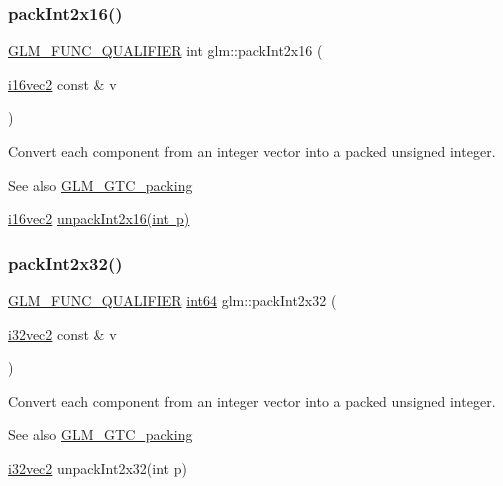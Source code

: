 \subsubsection{\texorpdfstring{pack\+Int2x16()}{packInt2x16()}}
{\footnotesize\ttfamily \mbox{\hyperlink{setup_8hpp_a33fdea6f91c5f834105f7415e2a64407}{G\+L\+M\+\_\+\+F\+U\+N\+C\+\_\+\+Q\+U\+A\+L\+I\+F\+I\+ER}} int glm\+::pack\+Int2x16 (\begin{DoxyParamCaption}\item[{\mbox{\hyperlink{group__gtc__type__precision_gad912fd04abb876a5b806118ec6e0f283}{i16vec2}} const \&}]{v }\end{DoxyParamCaption})}

Convert each component from an integer vector into a packed unsigned integer.

\begin{DoxySeeAlso}{See also}
\mbox{\hyperlink{group__gtc__packing}{G\+L\+M\+\_\+\+G\+T\+C\+\_\+packing}} 

\mbox{\hyperlink{group__gtc__type__precision_gad912fd04abb876a5b806118ec6e0f283}{i16vec2}} \mbox{\hyperlink{group__gtc__packing_ga639c216b452fc364b32c15eb5b8b6a87}{unpack\+Int2x16(int p)}} 
\end{DoxySeeAlso}
\mbox{\label{group__gtc__packing_ga1d6c24ff4f2b198eb2c4a2e4dcf7c336}} 
\subsubsection{\texorpdfstring{pack\+Int2x32()}{packInt2x32()}}
{\footnotesize\ttfamily \mbox{\hyperlink{setup_8hpp_a33fdea6f91c5f834105f7415e2a64407}{G\+L\+M\+\_\+\+F\+U\+N\+C\+\_\+\+Q\+U\+A\+L\+I\+F\+I\+ER}} \mbox{\hyperlink{group__gtc__type__precision_ga435d75819cce297cc5fa21bd84ef89a5}{int64}} glm\+::pack\+Int2x32 (\begin{DoxyParamCaption}\item[{\mbox{\hyperlink{group__gtc__type__precision_ga99191e0de942ecc1df32d522f8064789}{i32vec2}} const \&}]{v }\end{DoxyParamCaption})}

Convert each component from an integer vector into a packed unsigned integer.

\begin{DoxySeeAlso}{See also}
\mbox{\hyperlink{group__gtc__packing}{G\+L\+M\+\_\+\+G\+T\+C\+\_\+packing}} 

\mbox{\hyperlink{group__gtc__type__precision_ga99191e0de942ecc1df32d522f8064789}{i32vec2}} unpack\+Int2x32(int p) 
\end{DoxySeeAlso}
\mbox{\label{group__gtc__packing_ga532b06d8915c6c65649f828e9106a1d9}} 
